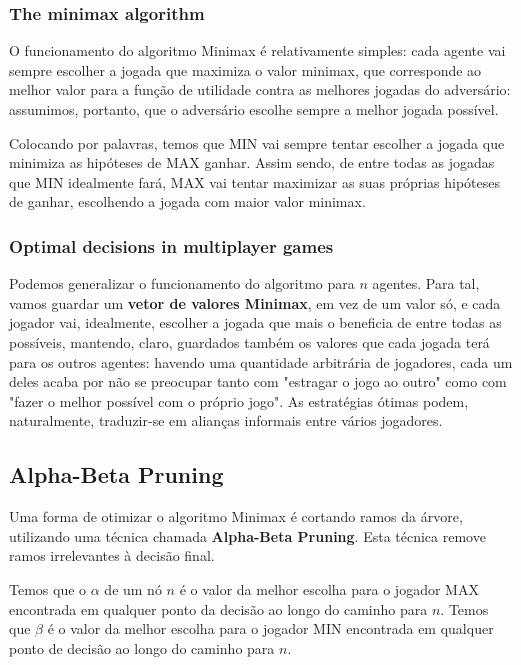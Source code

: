 \documentclass[11pt]{article}
\begin{document}
\subsubsection{The minimax algorithm}

O funcionamento do algoritmo Minimax é relativamente simples: cada agente vai sempre escolher a jogada que maximiza o valor minimax, que corresponde ao melhor valor para a função de utilidade contra as melhores jogadas do adversário: assumimos, portanto, que o adversário escolhe sempre a melhor jogada possível. \vspace{4pt}

Colocando por palavras, temos que MIN vai sempre tentar escolher a jogada que minimiza as hipóteses de MAX ganhar. Assim sendo, de entre todas as jogadas que MIN idealmente fará, MAX vai tentar maximizar as suas próprias hipóteses de ganhar, escolhendo a jogada com maior valor minimax.

\subsubsection{Optimal decisions in multiplayer games}

Podemos generalizar o funcionamento do algoritmo para $n$ agentes. Para tal, vamos guardar um \textbf{vetor de valores Minimax}, em vez de um valor só, e cada jogador vai, idealmente, escolher a jogada que mais o beneficia de entre todas as possíveis, mantendo, claro, guardados também os valores que cada jogada terá para os outros agentes: havendo uma quantidade arbitrária de jogadores, cada um deles acaba por não se preocupar tanto com "estragar o jogo ao outro" como com "fazer o melhor possível com o próprio jogo". As estratégias ótimas podem, naturalmente, traduzir-se em alianças informais entre vários jogadores.

\subsection{Alpha-Beta Pruning}

Uma forma de otimizar o algoritmo Minimax é cortando ramos da árvore, utilizando uma técnica chamada \textbf{Alpha-Beta Pruning}. Esta técnica remove ramos irrelevantes à decisão final.

Temos que o $\alpha$ de um nó $n$ é o valor da melhor escolha para o jogador MAX encontrada em qualquer ponto da decisão ao longo do caminho para $n$. Temos que $\beta$ é o valor da melhor escolha para o jogador MIN encontrada em qualquer ponto de decisão ao longo do caminho para $n$.
\end{document}
